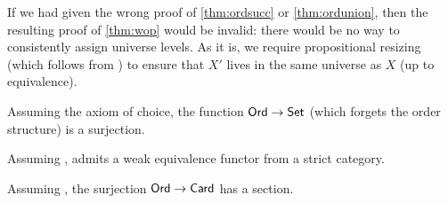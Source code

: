 \documentclass[hott-all.tex]{subfiles}
\begin{document}
% 
\begin{rmk}
  If we had given the wrong proof of \cref{thm:ordsucc} or \cref{thm:ordunion}, then the resulting proof of \cref{thm:wop} would be invalid: there would be no way to consistently assign universe levels.
  As it is, we require propositional resizing (which follows from \LEM{}) to ensure that $X'$ lives in the same universe as $X$ (up to equivalence).
\end{rmk}
% 
\begin{cor}
  Assuming the axiom of choice, the function $\mathsf{Ord}\to\mathsf{Set}$ (which forgets the order structure) is a surjection.
\end{cor}
% 
% 
\begin{cor}
  Assuming \choice{}, \uset admits a weak equivalence functor from a strict category.
\end{cor}
% 
% 
\begin{thm}
  Assuming \choice{}, the surjection $\mathsf{Ord}\to\mathsf{Card}$ has a section.
\end{thm}
% 
% 
% 
% 
% 
\end{document}
